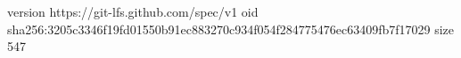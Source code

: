 version https://git-lfs.github.com/spec/v1
oid sha256:3205c3346f19fd01550b91ec883270c934f054f284775476ec63409fb7f17029
size 547
